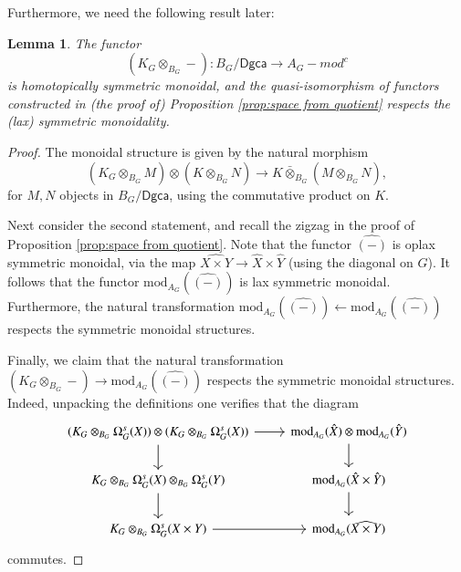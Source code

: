 \documentclass[a4paper]{amsart}
\theoremstyle{plain}
\newtheorem{lemma}[thm]{Lemma}
\theoremstyle{definition}
\newcommand{\dgca}{\mathsf{Dgca}}
\renewcommand{\mod}{\mathrm{mod}}
\begin{document}
Furthermore, we need the following result later:
\begin{lemma}\label{lem:module from equiv monoidal}
The functor 
\[
(K_G \otimes_{B_G} -) \colon B_G/\dgca \to A_G-mod^c
\]
is homotopically symmetric monoidal, and the quasi-isomorphism of functors constructed in (the proof of) Proposition \ref{prop:space from quotient} respects the (lax) symmetric monoidality.
\end{lemma}
\begin{proof}
 The monoidal structure is given by the natural morphism 
\[
(K_G \otimes_{B_G} M) \otimes (K \otimes_{B_G} N) \to K\bar \otimes_{B_G} (M\otimes_{B_G} N),
\]
for $M,N$ objects in $B_G/\dgca$, using the commutative product on $K$.

Next consider the second statement, and recall the zigzag in the proof of Proposition \ref{prop:space from quotient}.
Note that the functor $\hat{(-)}$ is oplax symmetric monoidal, via the map $\widehat{X\times Y}\to \hat X\times \hat Y$ (using the diagonal on $G$).
It follows that the functor $\mod_{A_G}(\hat {(-)})$ is lax symmetric monoidal. Furthermore, the natural transformation 
$\mod_{A_G}(\hat {(-)}) \leftarrow \mod_{A_G}(\hat {(-)})$
respects the symmetric monoidal structures.

Finally, we claim that the natural transformation $(K_G \otimes_{B_G} -)\to \mod_{A_G}(\hat {(-)})$ respects the symmetric monoidal structures.
Indeed, unpacking the definitions one verifies that the diagram
\[
 \begin{tikzcd}
  (K_G \otimes_{B_G} \Omega_G^s(X))\otimes (K_G \otimes_{B_G} \Omega_G^s(X)) \ar{d} \ar{r}
  & \mod_{A_G}(\hat X)\otimes \mod_{A_G}(\hat Y) \ar{d} 
  \\
  K_G \otimes_{B_G} \Omega_G^s(X) \otimes_{B_G} \Omega_G^s(Y) \ar{d}
  &
  \mod_{A_G}(\hat X\times \hat Y) \ar{d}
  \\
  K_G \otimes_{B_G} \Omega_G^s(X\times Y)\ar{r}
  &
  \mod_{A_G}(\widehat{X\times Y})
 \end{tikzcd}
\]
commutes.

\end{proof}
\end{document}

